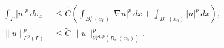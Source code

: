 
\setcounter{equation}{2}

\begin{page}
\begin{align}
\int_{\Gamma} |u|^p \, d\sigma_x
&\leq \tilde{C}\left(\int_{B_r^+(x_0)} |\nabla u|^p \, dx + \int_{B_r^+(x_0)} |u|^p \, dx\right),
\label{eq:step1-integral}\\
\|u\|_{L^p(\Gamma)}^{p} &\leq \tilde{C}\,\|u\|_{W^{1,p}(B_r^+(x_0))}^{p}.
\label{eq:step1-norm}
\end{align}
\end{page}

